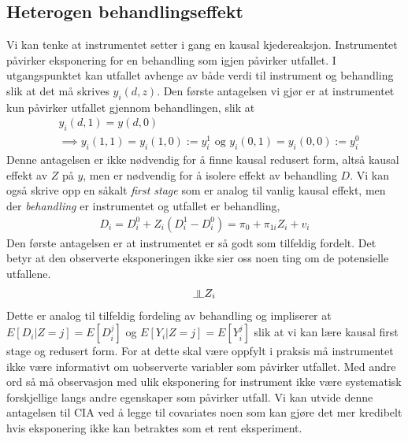 \subsection{Heterogen behandlingseffekt}
Vi kan tenke at instrumentet setter i gang en kausal kjedereaksjon. Instrumentet påvirker eksponering for en behandling som igjen påvirker utfallet. I utgangspunktet kan utfallet avhenge av både verdi til instrument og behandling slik at det må skrives $y_i(d,z)$. Den første antagelsen vi gjør er at instrumentet kun påvirker utfallet gjennom behandlingen, slik at
\begin{align}
&y_i(d,1) = y(d,0) \\
& \implies y_i(1,1) = y_i(1,0) :=y_i^1 \text{ og } y_i(0,1) = y_i(0,0) :=y_i^0
\end{align}
Denne antagelsen er ikke nødvendig for å finne kausal redusert form, altså kausal effekt av $Z$ på $y$, men er nødvendig for å isolere effekt av behandling $D$. Vi kan også skrive opp en såkalt \textit{first stage} som er analog til vanlig kausal effekt, men der \textit{behandling} er instrumentet og utfallet er behandling,
\begin{align}
D_i = D_i^0+Z_i(D_i^1-D_i^0) = \pi_0+\pi_{1i}Z_i+v_i
\end{align}
Den første antagelsen er at instrumentet er så godt som tilfeldig fordelt. Det betyr at den observerte eksponeringen ikke sier oss noen ting om de potensielle utfallene.
\begin{align}
[Y_i^1,Y_i^0 D_i^1,D_i^0] \indep Z_i
\end{align}
Dette er analog til tilfeldig fordeling av behandling og impliserer at $E[D_i|Z=j] =E[D_i^j]$ og $E[Y_i|Z=j] =E[Y_i^j]$ slik at vi kan lære kausal first stage og redusert form. For at dette skal være oppfylt i praksis må instrumentet ikke være informativt om uobserverte variabler som påvirker utfallet. Med andre ord så må observasjon med ulik eksponering for instrument ikke være systematisk forskjellige langs andre egenskaper som påvirker utfall. Vi kan utvide denne antagelsen til CIA ved å legge til covariates noen som kan gjøre det mer kredibelt hvis eksponering ikke kan betraktes som et rent eksperiment.

